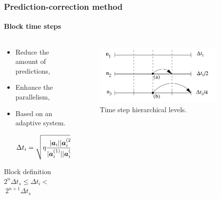 \begin{frame}[fragile]
    \frametitle{Prediction-correction method}
    \framesubtitle{Block time steps}
    \begin{columns}
        \begin{column}{0.6\textwidth}
            \begin{itemize}
                \item Reduce the amount of predictions,
                \item Enhance the parallelism,
                \item Based on an adaptive system.
                \begin{footnotesize}
                    \begin{dmath}
                        \Delta t_{i} = \sqrt{\eta  \frac{|\bs{a}_{i}|
                                                             |\bs{a}_{i}^{(2)}| +
                                                             |\bs{a}^{(1)}_{i}|^{2}}
                                                            {|\bs{a}^{(1)}_{i}|
                                                             |\bs{a}_{i}^{(3)}| +
                                                             |\bs{a}_{i}^{(2)}|^{2}}
                                                },\\
                    \end{dmath}
                \end{footnotesize}
            \end{itemize}

            \begin{small}
                \begin{block}{Block definition}
                    $2^{n} \Delta t_{s} \leq \Delta t_{i}\ $\textless$\ 2^{n+1} \Delta t_{s}$
                \end{block}
            \end{small}
        \end{column}
        \begin{column}{0.4\textwidth}
            \begin{figure}
                \centering
                \includegraphics[width=0.9\textwidth]{img/blockdt}
                \caption{Time step hierarchical levels.}
                \label{fig:blockdt}
            \end{figure}
        \end{column}
    \end{columns}
\end{frame}

